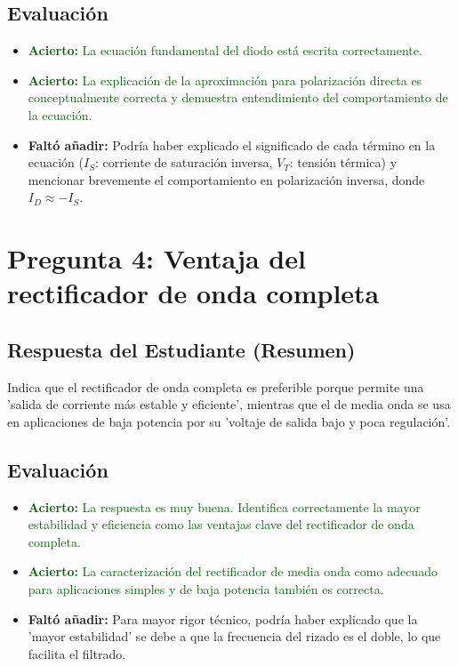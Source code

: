 \documentclass[12pt, a4paper]{article}
\newcommand{\acierto}[1]{\textcolor{darkgreen}{\textbf{Acierto:} #1}}
\newcommand{\faltante}[1]{\textcolor{blue!70!black}{\textbf{Faltó añadir:} #1}}
\begin{document}
\subsection*{Evaluación}
\begin{itemize}
    \item \acierto{La ecuación fundamental del diodo está escrita correctamente.}
    \item \acierto{La explicación de la aproximación para polarización directa es conceptualmente correcta y demuestra entendimiento del comportamiento de la ecuación.}
    \item \faltante{Podría haber explicado el significado de cada término en la ecuación ($I_S$: corriente de saturación inversa, $V_T$: tensión térmica) y mencionar brevemente el comportamiento en polarización inversa, donde $I_D \approx -I_S$.}
\end{itemize}

\section{Pregunta 4: Ventaja del rectificador de onda completa}

\subsection*{Respuesta del Estudiante (Resumen)}
Indica que el rectificador de onda completa es preferible porque permite una 'salida de corriente más estable y eficiente', mientras que el de media onda se usa en aplicaciones de baja potencia por su 'voltaje de salida bajo y poca regulación'.

\subsection*{Evaluación}
\begin{itemize}
    \item \acierto{La respuesta es muy buena. Identifica correctamente la mayor estabilidad y eficiencia como las ventajas clave del rectificador de onda completa.}
    \item \acierto{La caracterización del rectificador de media onda como adecuado para aplicaciones simples y de baja potencia también es correcta.}
    \item \faltante{Para mayor rigor técnico, podría haber explicado que la 'mayor estabilidad' se debe a que la frecuencia del rizado es el doble, lo que facilita el filtrado.}
\end{itemize}
\end{document}
